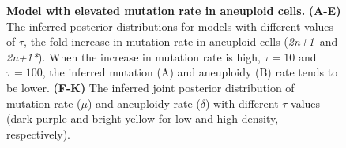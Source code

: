 \documentclass[12pt]{extarticle}
\newcommand{\anwt}{\emph{2n+1}}
\newcommand{\anmt}{\emph{2n+1*}}
\begin{document}
\begin{figure}[h!]
\begin{subfigure}{0.325\textwidth}
  \end{subfigure}
  \caption{
    \textbf{Model with elevated mutation rate in aneuploid cells.}  \textbf{(A-E)} The inferred posterior distributions for models with different values of $\tau$, the fold-increase in mutation rate in aneuploid cells (\anwt\ and \anmt). When the increase in mutation rate is high, $\tau=10$ and $\tau=100$, the inferred mutation (A) and aneuploidy (B) rate tends to be lower. 
    \textbf{(F-K)} The inferred joint posterior distribution of mutation rate ($\mu$) and aneuploidy rate ($\delta$) with different $\tau$ values (dark purple and bright yellow for low and high density, respectively).
  \label{fig:tau}
  }
  \end{figure}
  
\end{document}
